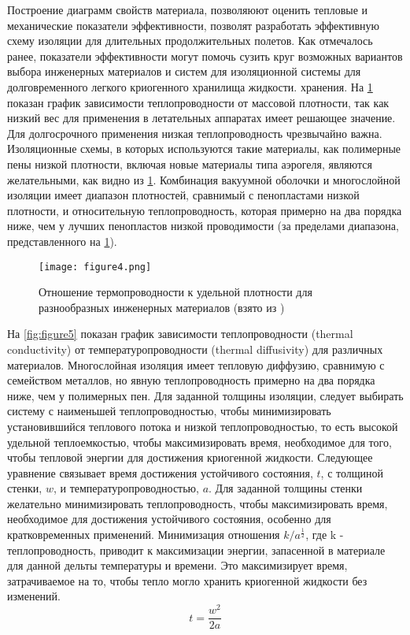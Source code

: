 Построение диаграмм свойств материала, позволяюют оценить тепловые и механические показатели эффективности,  позволят разработать эффективную схему изоляции для длительных продолжительных полетов. Как отмечалось ранее, показатели эффективности могут помочь сузить круг возможных вариантов выбора инженерных материалов и систем для изоляционной системы для долговременного легкого криогенного хранилища жидкости. хранения. На \cref{fig:figure4} показан график зависимости теплопроводности от массовой плотности, так как низкий вес для применения в летательных аппаратах имеет решающее значение. Для долгосрочного применения низкая теплопроводность чрезвычайно важна. Изоляционные схемы, в которых используются такие материалы, как полимерные пены низкой плотности, включая новые материалы типа аэрогеля, являются желательными, как видно из \cref{fig:figure4}. Комбинация вакуумной оболочки и многослойной изоляции имеет диапазон плотностей, сравнимый с пенопластами низкой плотности, и относительную теплопроводность, которая примерно на два порядка ниже, чем у лучших пенопластов низкой проводимости (за пределами диапазона, представленного на \cref{fig:figure4}).
\begin{figure}[h!]
\centering
\texttt{[image: figure4.png]}%

\caption{Отношение термопроводности к удельной плотности для разнообразных инженерных материалов (взято из \cite{ashby2005})}
\label{fig:figure4}
\end{figure}


На \cref{fig:figure5} показан график зависимости теплопроводности (thermal conductivity) от температуропроводности (thermal diffusivity) для различных материалов. Многослойная изоляция имеет тепловую диффузию, сравнимую с семейством металлов, но явную теплопроводность примерно на два порядка ниже, чем у полимерных пен. Для заданной толщины изоляции, следует выбирать систему с наименьшей теплопроводностью, чтобы минимизировать установившийся теплового потока и низкой теплопроводностью, то есть высокой удельной теплоемкостью, чтобы максимизировать время, необходимое для того, чтобы тепловой энергии для достижения криогенной жидкости. Следующее уравнение связывает время достижения устойчивого состояния, \(t\), с толщиной стенки, \(w\), и температуропроводностью, \(a\).
Для заданной толщины стенки желательно минимизировать теплопроводность, чтобы максимизировать время, необходимое для достижения устойчивого состояния, особенно для кратковременных применений. Минимизация отношения \(k/a^{\frac{1}{2}}\), где k - теплопроводность, приводит к максимизации энергии, запасенной в материале для данной дельты температуры и времени. Это максимизирует время, затрачиваемое на то, чтобы тепло могло хранить криогенной жидкости без изменений. 
\[t=\frac{w^2}{2a}\]

